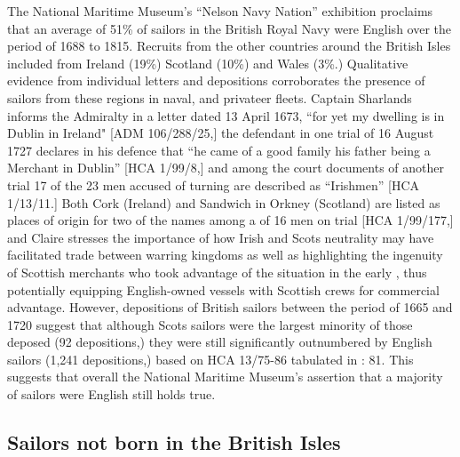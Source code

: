 The National Maritime Museum’s “Nelson Navy Nation” exhibition proclaims that an average of 51\% of sailors in the British Royal Navy were English over the period of 1688 to 1815. Recruits from the other countries around the British Isles included  from Ireland (19\%) Scotland (10\%) and Wales (3\%.) Qualitative evidence from individual letters and depositions corroborates the presence of sailors from these regions in naval,  and privateer fleets. Captain Sharlands informs the Admiralty in a letter dated 13 April {1673}, “for yet my dwelling is in Dublin in Ireland" [ADM 106/288/25,] the defendant in one trial of 16 August {1727} declares in his defence that “he came of a good family his father being a Merchant in Dublin” [HCA 1/99/8,] and among the court documents of another trial 17 of the 23 men accused of turning  are described as “Irishmen” [HCA 1/13/11.] Both Cork (Ireland) and Sandwich in Orkney (Scotland) are listed as places of origin for two of the names among a  of 16 men on trial [HCA 1/99/177,] and Claire \citet{McLoughlin2013} stresses the importance of how Irish and Scots neutrality may have facilitated trade between warring kingdoms as well as highlighting the ingenuity of Scottish merchants who took advantage of the situation in the early , thus potentially equipping English-owned vessels with Scottish crews for commercial advantage. However, depositions of British sailors between the period of 1665 and 1720 suggest that although Scots sailors were the largest minority of those deposed (92 depositions,) they were still significantly outnumbered by English sailors (1,241 depositions,) based on HCA 13/75-86 tabulated in \citealt{Earle1993}: 81. This suggests that overall the National Maritime Museum’s assertion that a majority of sailors were English still holds true.  

\subsection{{Sailors not born in the British Isles}}\label{sec:3.9.3}

